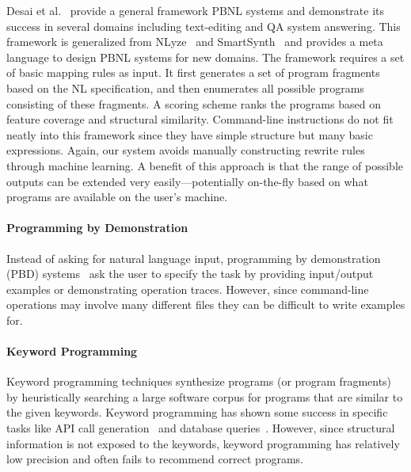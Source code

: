 Desai et al.~\cite{DBLP:journals/corr/DesaiGHJKMRR15} provide a general framework PBNL systems and demonstrate its success in several domains including text-editing and QA system answering. This framework is generalized from NLyze~\cite{DBLP:conf/sigmod/GulwaniM14} and SmartSynth~\cite{DBLP:conf/mobisys/LeGS13} and provides a meta language to design PBNL systems for new domains. The framework requires a set of basic mapping rules as input. It first generates a set of program fragments based on the NL specification, and then enumerates all possible programs consisting of these fragments. A scoring scheme ranks the programs based on feature coverage and structural similarity. Command-line instructions do not fit neatly into this framework since they have simple structure but many basic expressions. Again, our system avoids manually constructing rewrite rules through machine learning. A benefit of this approach is that the range of possible outputs can be extended very easily---potentially on-the-fly based on what programs are available on the user's machine.

\paragraph{Programming by Demonstration} Instead of asking for natural language input, programming by demonstration (PBD) systems~\cite{DBLP:journals/ml/LauWDW03, DBLP:journals/cacm/GulwaniHS12, DBLP:conf/pldi/HarrisG11, DBLP:conf/popl/Gulwani11} ask the user to specify the task by providing input/output examples or demonstrating operation traces. However, since command-line operations may involve many different files they can be difficult to write examples for.

\paragraph{Keyword Programming} Keyword programming techniques synthesize programs (or program fragments) by heuristically searching a large software corpus for programs that are similar to the given keywords. Keyword programming has shown some success in specific tasks like API call generation~\cite{DBLP:journals/ase/LittleM09, DBLP:conf/pldi/MandelinXBK05} and database queries~\cite{DBLP:conf/icde/AgrawalCD02, DBLP:conf/icde/BhalotiaHNCS02}. However, since structural information is not exposed to the keywords, keyword programming has relatively low precision and often fails to recommend correct programs.

